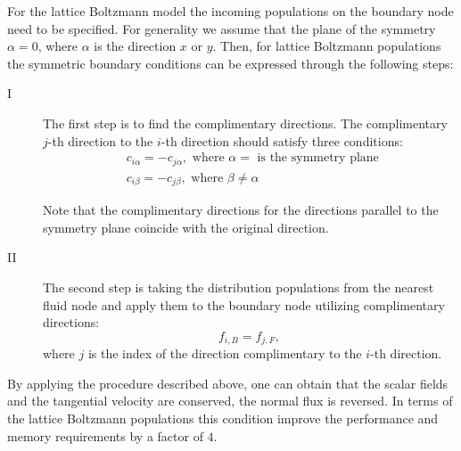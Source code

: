\documentclass{article}
\begin{document}
For the lattice Boltzmann model the incoming populations on the boundary node need to be specified.
For generality we assume that the plane of the symmetry $\alpha=0$, where $\alpha$ is the
direction $x$ or $y$. Then, for lattice Boltzmann populations the symmetric boundary conditions can
be expressed through the following steps:
\begin{description}
\item[I] The first step is to find the complimentary directions. The complimentary $j$-th direction
to the $i$-th direction should satisfy three conditions:
\begin{equation}
\begin{aligned}
&c_{i\alpha}=-c_{j\alpha}, \text{ where $\alpha=$ is the symmetry plane }\\
&c_{i\beta}=-c_{j\beta}, \text{ where $\beta\neq\alpha$ }
\end{aligned}
\end{equation}

Note that the complimentary directions for the directions parallel to the symmetry plane coincide
with the original direction.

\item[II] The second step is taking the distribution populations from the nearest fluid node and
apply them to the boundary node utilizing complimentary directions:
\begin{equation}
f_{i,B}=f_{j,F},
\end{equation}
where $j$ is the index of the direction complimentary to the $i$-th direction.
\end{description}

By applying the procedure described above, one can obtain that the scalar fields and the tangential
velocity are conserved, the normal flux is reversed. In terms of the lattice Boltzmann populations
this condition improve the performance and memory requirements by a factor of $4$. 



\end{document}
